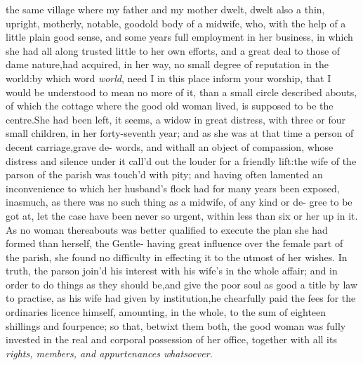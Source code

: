 \documentclass{article}
\begin{document}
 the same village where my father
and my mother dwelt, dwelt also a thin, upright, motherly, notable,
good\break old body of a midwife, who, with the help of a little plain
good sense, and some years full employment in her business, in
which she had all along trusted little to her own efforts, and a
great deal to those of dame nature,\tsk  had acquired, in her way,
no small degree of reputation in the world:\tsk  by which word
\textit{world}, need I in this place inform your worship,
that I would be understood to mean no 
more of it, than a small circle described 
abouts, of which the cottage where the good old woman lived, is supposed to be
the centre.\tsh  She had been left, it seems, a widow in great distress, with three or
four small children, in her forty-seventh year; and as she was at that time a person
of decent carriage,\tsk  grave de-\break
{}
words, and
withall an object of compassion, whose distress and silence under it call’d out the
louder for a friendly lift:\break the wife of the parson of the parish was touch’d with
pity; and having often la\-mented an inconvenience to which her husband’s flock had
for many years been exposed, inasmuch, as there was no such thing as a midwife, of
any kind or de- gree to be got at, let the case have been never so urgent, within
less than six or 
her up in it. As no woman thereabouts was better
qualified to execute the plan she had formed than
herself, the Gentle-
having great influence over the female part of the
parish, she found no difficulty in effecting it to
the utmost of her wishes. In truth, the parson
join’d his interest 
with his wife’s in the whole affair; and in order to
do things as they should be,\break and give the poor
soul as good a title by law to practise, as his wife
had given by institution,\tsk he chearfully paid the
fees for the ordinaries licence himself, amounting,
in the whole, to the sum of eighteen shillings and
fourpence; so that, betwixt them both, the good
woman was fully invested in the real and corporal
possession of her office, together with all its
\textit{rights, members, and appurtenances
whatsoever.}
\end{document}
